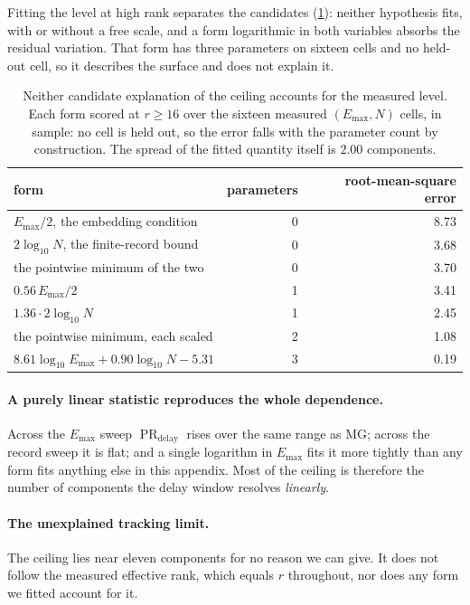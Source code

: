 \documentclass{article}
\DeclareMathOperator{\PR}{PR}
\begin{document}
Fitting the level at high rank separates the candidates (\cref{tab:ceilingfit}): neither
hypothesis fits, with or without a free scale, and a form logarithmic in both variables absorbs
the residual variation. That form has three parameters on sixteen cells and no held-out cell, so it
describes the surface and does not explain it.

\begin{table}[H]
\centering
\caption{Neither candidate explanation of the ceiling accounts for the measured level.
Each form scored at $r \ge 16$ over the sixteen measured $(E_{\max}, N)$ cells, in sample: no cell
is held out, so the error falls with the parameter count by construction. The spread of the fitted
quantity itself is $2.00$ components.}
\label{tab:ceilingfit}
\begin{tabular}{lrr}
\toprule
form & parameters & root-mean-square error \\
\midrule
$E_{\max}/2$, the embedding condition           & 0 & 8.73 \\
$2\log_{10}N$, the finite-record bound          & 0 & 3.68 \\
the pointwise minimum of the two                & 0 & 3.70 \\
$0.56 \, E_{\max}/2$                            & 1 & 3.41 \\
$1.36 \cdot 2\log_{10}N$                        & 1 & 2.45 \\
the pointwise minimum, each scaled              & 2 & 1.08 \\
$8.61\log_{10}E_{\max} + 0.90\log_{10}N - 5.31$ & 3 & 0.19 \\
\bottomrule
\end{tabular}
\end{table}

\paragraph{A purely linear statistic reproduces the whole dependence.} Across the $E_{\max}$ sweep
$\PR_{\mathrm{delay}}$ rises over the same range as MG; across the record sweep it is flat; and a
single logarithm in $E_{\max}$ fits it more tightly than any form fits anything else in this
appendix. Most of the ceiling is therefore the number of components the delay window resolves
\emph{linearly}.

\paragraph{The unexplained tracking limit.} The ceiling lies near eleven components for no reason
we can give. It does not follow the measured effective rank, which equals $r$ throughout, nor does
any form we fitted account for it.
\end{document}
